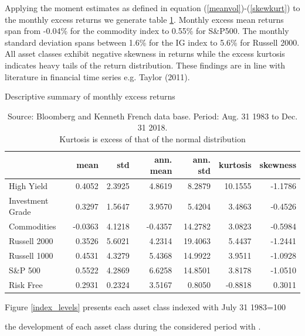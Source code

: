 \documentclass[11pt,a4paper,oneside]{article}
\begin{document}
\noindent Applying the moment estimates as defined in equation (\ref{meanvol})-(\ref{skewkurt}) to the monthly excess returns we generate table \ref{descriptive_statistics}. Monthly excess mean returns span from -0.04\% for the commodity index to 0.55\% for S\&P500. The monthly standard deviation spans between 1.6\% for the IG index to 5.6\% for Russell 2000. All asset classes exhibit negative skewness in returns while the excess kurtosis indicates heavy tails of the return distribution. These findings are in line with literature in financial time series e.g. Taylor (2011)\cite{Taylor}.           

\begin{table}[h!]
\centering
\captionsetup{justification=centering,margin=0.6cm}
\caption{Descriptive summary of monthly excess returns}
\label{descriptive_statistics}
\begin{tabular}{lrrrrrr}
\toprule
{} &    mean &     std &  ann. mean &  ann. std &  kurtosis &  skewness \\
\midrule
High Yield       &  0.4052 &  2.3925 &     4.8619 &    8.2879 &   10.1555 &   -1.1786 \\
Investment Grade &  0.3297 &  1.5647 &     3.9570 &    5.4204 &    3.4863 &   -0.4526 \\
Commodities      & -0.0363 &  4.1218 &    -0.4357 &   14.2782 &    3.0823 &   -0.5984 \\
Russell 2000     &  0.3526 &  5.6021 &     4.2314 &   19.4063 &    5.4437 &   -1.2441 \\
Russell 1000     &  0.4531 &  4.3279 &     5.4368 &   14.9922 &    3.9511 &   -1.0928 \\
S\&P 500          &  0.5522 &  4.2869 &     6.6258 &   14.8501 &    3.8178 &   -1.0510 \\
Risk Free        &  0.2931 &  0.2324 &     3.5167 &    0.8050 &   -0.8818 &    0.3011 \\
\bottomrule
\end{tabular}
\caption*{Source: Bloomberg and Kenneth French data base.
Period: Aug. 31 1983 to Dec. 31 2018. \\ Kurtosis is excess of that of the normal distribution}
\end{table}

\noindent Figure \ref{index_levels} presents each asset class indexed with July 31 1983=100


the development of each asset class during the considered period with .  

   
\end{document}
